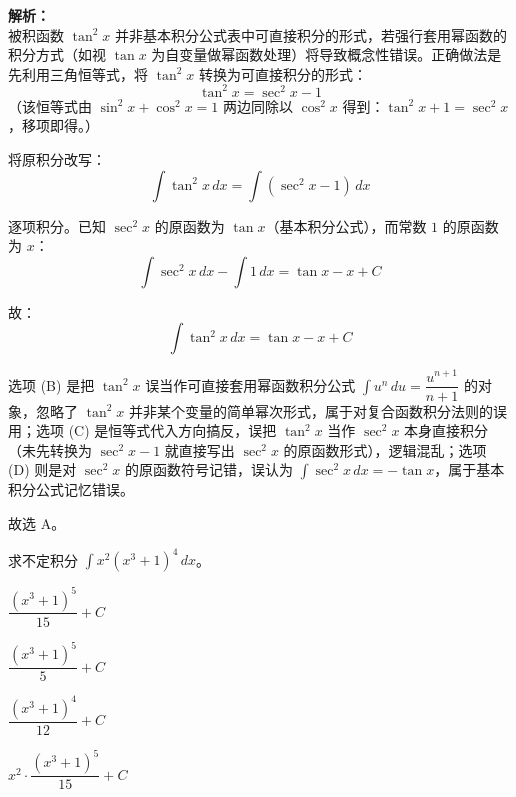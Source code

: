 \documentclass[12pt,a4paper]{exam-zh}
\begin{document}
\begin{solution}
    \textbf{解析：} \\
    被积函数 $\tan^2 x$ 并非基本积分公式表中可直接积分的形式，若强行套用幂函数的积分方式（如视 $\tan x$ 为自变量做幂函数处理）将导致概念性错误。正确做法是先利用三角恒等式，将 $\tan^2 x$ 转换为可直接积分的形式：
    \[ \displaystyle \tan^2 x = \sec^2 x - 1 \]
    （该恒等式由 $\sin^2x+\cos^2x=1$ 两边同除以 $\cos^2x$ 得到：$\tan^2x+1=\sec^2x$，移项即得。）

    将原积分改写：
    \[ \displaystyle \int \tan^2 x\,dx = \int (\sec^2 x - 1)\,dx \]

    逐项积分。已知 $\sec^2x$ 的原函数为 $\tan x$（基本积分公式），而常数 $1$ 的原函数为 $x$：
    \[ \displaystyle \int \sec^2 x\,dx - \int 1\,dx = \tan x - x + C \]

    故：
    \[ \displaystyle \int \tan^2 x\,dx = \tan x - x + C \]

    选项 (B) 是把 $\tan^2x$ 误当作可直接套用幂函数积分公式 $\int u^n\,du=\dfrac{u^{n+1}}{n+1}$ 的对象，忽略了 $\tan^2x$ 并非某个变量的简单幂次形式，属于对复合函数积分法则的误用；选项 (C) 是恒等式代入方向搞反，误把 $\tan^2x$ 当作 $\sec^2x$ 本身直接积分（未先转换为 $\sec^2x-1$ 就直接写出 $\sec^2x$ 的原函数形式），逻辑混乱；选项 (D) 则是对 $\sec^2x$ 的原函数符号记错，误认为 $\int\sec^2x\,dx=-\tan x$，属于基本积分公式记忆错误。

    故选 A。
\end{solution}

\begin{question}
    求不定积分 $\displaystyle\int x^2(x^3+1)^4\,dx$。\paren[A]
    \begin{choices}
        \item $\dfrac{(x^3+1)^5}{15} + C$
        \item $\dfrac{(x^3+1)^5}{5} + C$
        \item $\dfrac{(x^3+1)^4}{12} + C$
        \item $x^2 \cdot \dfrac{(x^3+1)^5}{15} + C$
    \end{choices}
\end{question}
\end{document}
